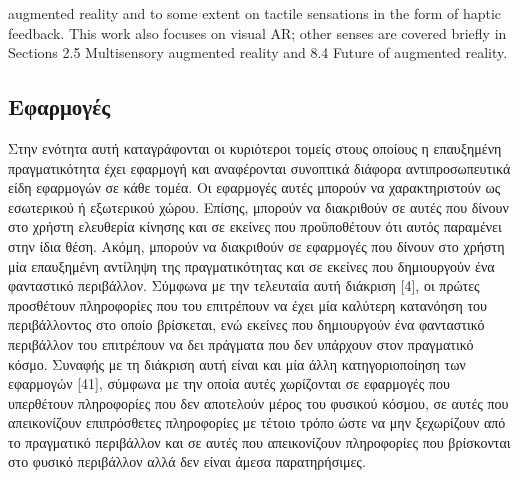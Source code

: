 augmented reality and to some extent on tactile sensations in the form of haptic feedback. This work also focuses on visual AR; other senses are covered briefly in Sections 2.5 Multisensory augmented reality and 8.4 Future of augmented reality.



\subsection{Εφαρμογές}

Στην ενότητα αυτή καταγράφονται οι κυριότεροι τομείς στους οποίους η επαυξημένη πραγματικότητα έχει εφαρμογή και αναφέρονται συνοπτικά διάφορα αντιπροσωπευτικά είδη εφαρμογών σε κάθε τομέα. Οι εφαρμογές αυτές μπορούν να χαρακτηριστούν ως εσωτερικού ή εξωτερικού χώρου. Επίσης, μπορούν να διακριθούν σε αυτές που δίνουν στο χρήστη ελευθερία κίνησης και σε εκείνες που προϋποθέτουν ότι αυτός παραμένει στην ίδια θέση. Ακόμη, μπορούν να διακριθούν σε εφαρμογές που δίνουν στο χρήστη μία επαυξημένη αντίληψη της πραγματικότητας και σε εκείνες που δημιουργούν ένα φανταστικό περιβάλλον. Σύμφωνα με την τελευταία αυτή διάκριση [4], οι πρώτες προσθέτουν πληροφορίες που του επιτρέπουν να έχει μία καλύτερη κατανόηση του περιβάλλοντος στο οποίο βρίσκεται, ενώ εκείνες που δημιουργούν ένα φανταστικό περιβάλλον του επιτρέπουν να δει πράγματα που δεν υπάρχουν στον πραγματικό κόσμο. Συναφής με τη διάκριση αυτή είναι και μία άλλη κατηγοριοποίηση των εφαρμογών [41], σύμφωνα με την οποία αυτές χωρίζονται σε εφαρμογές που υπερθέτουν πληροφορίες που δεν αποτελούν μέρος του φυσικού κόσμου, σε αυτές που απεικονίζουν επιπρόσθετες πληροφορίες με τέτοιο τρόπο ώστε να μην ξεχωρίζουν από το πραγματικό περιβάλλον και σε αυτές που απεικονίζουν πληροφορίες που βρίσκονται στο φυσικό περιβάλλον αλλά δεν είναι άμεσα παρατηρήσιμες.

